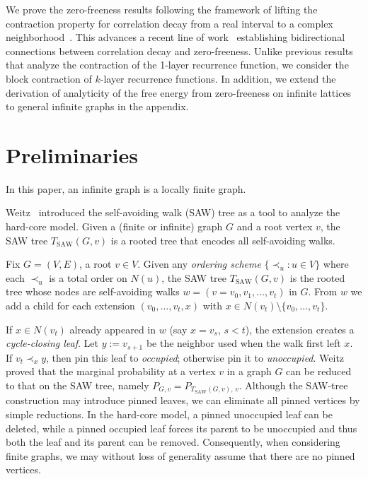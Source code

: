 \documentclass[a4paper,11pt]{article}
\theoremstyle{plain}
\theoremstyle{definition}
\theoremstyle{remark}
\newcommand{\1}{\mathbf{1}}
\begin{document}
 
We prove the zero-freeness results following the framework of lifting the contraction property for correlation decay from a real interval to a complex neighborhood~\cite{peters2019conjecture,liu2019fisher,peters2020location,shao2021contraction,liu2022correlation}. 
This advances a recent line of work~\cite{gamarnik2023correlation,regts2023absence,shao2024zero,shao2025zero} establishing bidirectional connections between correlation decay and zero-freeness.
Unlike previous results that analyze the contraction of the 1-layer recurrence function, we consider the block contraction of $k$-layer recurrence functions. 
In addition, we extend the derivation of analyticity of the free energy from zero-freeness on infinite lattices to general infinite graphs in the appendix.





\section{Preliminaries}


In this paper, an infinite graph is a locally finite graph. 

Weitz~\cite{weitz2006counting} introduced the self-avoiding walk (SAW) tree as a tool to analyze the hard-core model.
Given a (finite or infinite) graph $G$ and a root vertex $v$, the SAW tree $T_{\mathrm{SAW}}(G,v)$ is a rooted tree that encodes all self-avoiding walks.

Fix $G=(V,E)$, a root $v\in V$. Given any \emph{ordering scheme} $\{\prec_u: u\in V\}$
where each $\prec_u$ is a total order on $N(u)$,
the SAW tree $T_{\mathrm{SAW}}(G,v)$ is the rooted tree whose nodes are
self-avoiding walks $w=(v=v_0,v_1,\dots,v_t)$ in $G$.
From $w$ we add a child for each extension $(v_0,\dots,v_t,x)$ with
$x\in N(v_t)\setminus\{v_0,\dots,v_t\}$.

If $x\in N(v_t)$ already appeared in $w$ (say $x=v_s$, $s<t$), the extension creates
a \emph{cycle-closing leaf}. Let $y:=v_{s+1}$ be the neighbor used when the walk first
left $x$. If $v_t \prec_x y$, then pin this leaf to \emph{occupied};
otherwise pin it to \emph{unoccupied}.
Weitz proved that the marginal probability at a vertex $v$ in a graph $G$ can be reduced to that on the SAW tree, namely
$P_{G,v} = P_{T_{\mathrm{SAW}}(G,v),\,v}$.
Although the SAW-tree construction may introduce pinned leaves, we can eliminate all pinned vertices by simple reductions. In the hard-core model, a pinned unoccupied leaf can be deleted, while a pinned occupied leaf forces its parent to be unoccupied and thus both the leaf and its parent can be removed.
Consequently, when considering finite graphs, we may without loss of
generality assume that there are no pinned vertices.
\end{document}
